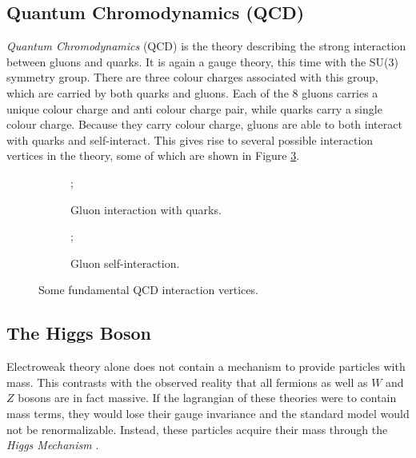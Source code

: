 \subsection{Quantum Chromodynamics (QCD)}
\textit{Quantum Chromodynamics} (QCD) \cite{pdg_rev,black_book} is the theory describing the strong interaction between gluons and quarks. It is again a gauge theory, this time with the SU(3) symmetry group. There are three colour charges associated with this group, which are carried by both quarks and gluons. Each of the 8 gluons carries a unique colour charge and anti colour charge pair, while quarks carry a single colour charge. Because they carry colour charge, gluons are able to both interact with quarks and self-interact. This gives rise to several possible interaction vertices in the theory, some of which are shown in Figure \ref{fig:QCDVertices}.

\begin{figure}[H]
    \begin{subfigure}{.5\textwidth}
        \centering
        ;
        \caption{Gluon interaction with quarks.}
        \label{fig:QCDvertexa}
    \end{subfigure}
    \begin{subfigure}{.5\textwidth}
        \centering
        ;
        \caption{Gluon self-interaction.}
        \label{fig:QCDVertexb}
    \end{subfigure}
    \caption{Some fundamental QCD interaction vertices.}
    \label{fig:QCDVertices}
\end{figure}

\subsection{The Higgs Boson}
Electroweak theory alone does not contain a mechanism to provide particles with mass. This contrasts with the observed reality that all fermions as well as $W$ and $Z$ bosons are in fact massive. If the lagrangian of these theories were to contain mass terms, they would lose their gauge invariance and the standard model would not be renormalizable. Instead, these particles acquire their mass through the \textit{Higgs Mechanism} \cite{Englert, Higgs1, Higgs2}. 

